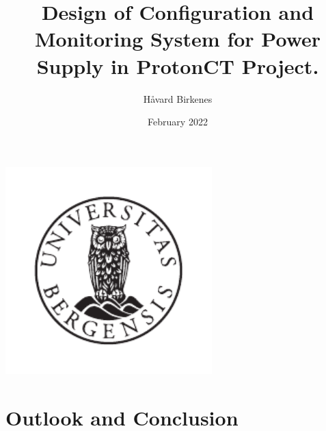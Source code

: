 \documentclass[12pt]{article}
\title{Design of Configuration and Monitoring System for Power Supply in ProtonCT Project.}
\author{Håvard Birkenes}
\date{February 2022}
\begin{document}
\renewcommand{\notinmain}[1]{}
    \maketitle
    \begin{center}
        \includegraphics[width=8cm]{images/UiB-emblem_gray.pdf}
    \end{center}


   \newpage
   
    \newpage
    \tableofcontents
    \newpage
    \printglossary
    \printglossary[type=\acronymtype]
    \newpage
    
    \newpage






    
\newpage
    
\newpage
    
\newpage
    
\newpage
    
\newpage

    
\newpage
\section{Outlook and Conclusion}


\newpage


\newpage


\end{document}
